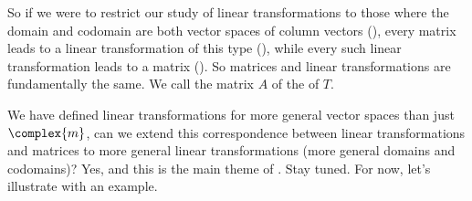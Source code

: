 %
So if we were to restrict our study of linear transformations to those where the domain and codomain are both vector spaces of column vectors (), every matrix leads to a linear transformation of this type (), while every such linear transformation leads to a matrix ().  So matrices and linear transformations are fundamentally the same.  We call the matrix $A$ of  the  of $T$.\par
%
We have defined linear transformations for more general vector spaces than just $\complex{m}$, can we extend this correspondence between linear transformations and matrices to more general linear transformations (more general domains and codomains)?  Yes, and this is the main theme of .  Stay tuned.  For now, let's illustrate  with an example.\par
%
